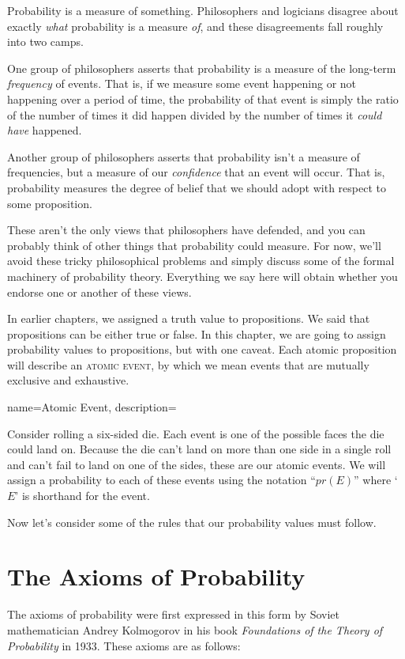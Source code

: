 Probability is a measure of something. Philosophers and logicians disagree about exactly \emph{what} probability is a measure \emph{of}, and these disagreements fall roughly into two camps.

One group of philosophers asserts that probability is a measure of the long-term \emph{frequency} of events. That is, if we measure some event happening or not happening over a period of time, the probability of that event is simply the ratio of the number of times it did happen divided by the number of times it \emph{could have} happened.

Another group of philosophers asserts that probability isn't a measure of frequencies, but a measure of our \emph{confidence} that an event will occur. That is, probability measures the degree of belief that we should adopt with respect to some proposition.

These aren't the only views that philosophers have defended, and you can probably think of other things that probability could measure. For now, we'll avoid these tricky philosophical problems and simply discuss some of the formal machinery of probability theory. Everything we say here will obtain whether you endorse one or another of these views.

In earlier chapters, we assigned a \gls{truth value} to propositions. We said that propositions can be either true or false. In this chapter, we are going to assign probability values to propositions, but with one caveat. Each atomic proposition will describe an \textsc{\gls{atomic event}}, by which we mean events that are mutually exclusive and exhaustive.

{
name=Atomic Event,
description={}
}

Consider rolling a six-sided die. Each event is one of the possible faces the die could land on. Because the die can't land on more than one side in a single roll and can't fail to land on one of the sides, these are our atomic events. We will assign a probability to each of these events using the notation ``$pr(E)$'' where `$E$' is shorthand for the event.

Now let's consider some of the rules that our probability values must follow.

\section{The Axioms of Probability}

The axioms of probability were first expressed in this form by Soviet mathematician Andrey Kolmogorov in his book \textit{Foundations of the Theory of Probability} in 1933. These axioms are as follows:

